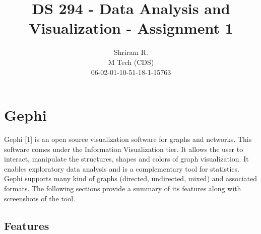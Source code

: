 \documentclass[11pt,a4paper,oneside]{article}
\begin{document}
	\title{DS 294 - Data Analysis and Visualization - Assignment 1}
	\author{Shriram R. \\ M Tech (CDS) \\ 06-02-01-10-51-18-1-15763}
	\maketitle	
	
	\section{Gephi}
	Gephi [1] is an open source visualization software for graphs and networks. This software comes under the Information Visualization tier. It allows the user to interact, manipulate the structures, shapes and colors of graph visualization. It enables exploratory data analysis and is a complementary tool for statistics. Gephi supports many kind of graphs (directed, undirected, mixed) and associated formats. The following sections provide a summary of its features along with screenshots of the tool.
	
	\subsection{Features}
	
\end{document}
